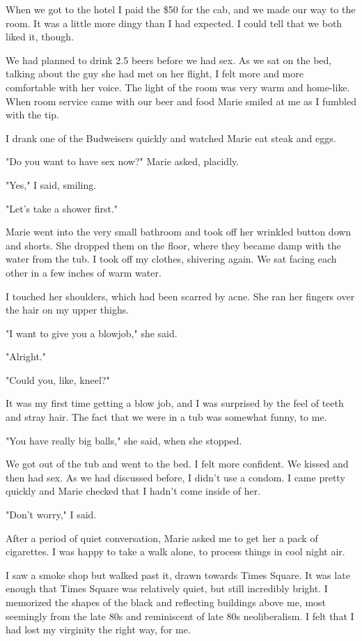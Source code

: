 \documentclass[12pt]{memoir}
\begin{document}
When we got to the hotel I paid the \$50 for the cab, and we made our way to the
room.  It was a little more dingy than I had expected.  I could tell that we
both liked it, though.

We had planned to drink 2.5 beers before we had sex.  As we sat on the bed,
talking about the guy she had met on her flight, I felt more and more
comfortable with her voice.  The light of the room was very warm and home-like.
When room service came with our beer and food Marie smiled at me as I fumbled with the
tip.  

I drank one of the Budweisers quickly and watched Marie eat steak and eggs.  

"Do you want to have sex now?" Marie asked, placidly.

"Yes," I said, smiling.

"Let's take a shower first."

Marie went into the very small bathroom and took off her wrinkled button
down and shorts.  She dropped them on the floor, where they became damp with the
water from the tub.  I took off my clothes, shivering again.  We sat
facing each other in a few inches of warm water.

I touched her shoulders, which had been scarred by acne.  She ran her fingers
over the hair on my upper thighs.

"I want to give you a blowjob," she said.

"Alright."

"Could you, like, kneel?"

It was my first time getting a blow job, and I was surprised by the feel of
teeth and stray hair.  The fact that we were in a tub was somewhat funny, to me.

"You have really big balls," she said, when she stopped.

We got out of the tub and went to the bed.  I felt more confident.  We kissed
and then had sex.  As we had discussed before, I didn't use a condom.  I came
pretty quickly and Marie checked that I hadn't come inside of her.  

"Don't worry," I said. 

After a period of quiet conversation, Marie asked me to get her a pack of
cigarettes.  I was happy to take a walk alone, to process things in cool night
air.

I saw a smoke shop but walked past it, drawn towards Times Square.  It was late
enough that Times Square was relatively quiet, but still incredibly bright.  I
memorized the shapes of the black and reflecting buildings above me, most
seemingly from the late 80s and reminiscent of late 80s neoliberalism.  I felt
that I had lost my virginity the right way, for me.  
\end{document}
